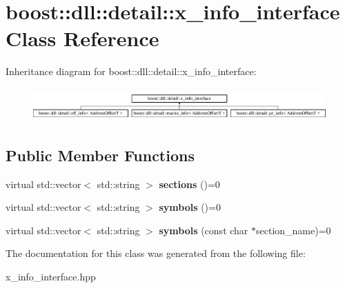 \hypertarget{a00337}{}\section{boost\+:\+:dll\+:\+:detail\+:\+:x\+\_\+info\+\_\+interface Class Reference}
\label{a00337}
Inheritance diagram for boost\+:\+:dll\+:\+:detail\+:\+:x\+\_\+info\+\_\+interface\+:\begin{figure}[H]
\begin{center}
\leavevmode
\includegraphics[height=1.296296cm]{a00337}
\end{center}
\end{figure}
\subsection*{Public Member Functions}
\begin{DoxyCompactItemize}
\item 
virtual std\+::vector$<$ std\+::string $>$ {\bfseries sections} ()=0\hypertarget{a00337_a34d086805a08f646f9e10ef010e0b205}{}\label{a00337_a34d086805a08f646f9e10ef010e0b205}

\item 
virtual std\+::vector$<$ std\+::string $>$ {\bfseries symbols} ()=0\hypertarget{a00337_ab6a8a24f236aafc5cdf8fa1b6ce61dab}{}\label{a00337_ab6a8a24f236aafc5cdf8fa1b6ce61dab}

\item 
virtual std\+::vector$<$ std\+::string $>$ {\bfseries symbols} (const char $\ast$section\+\_\+name)=0\hypertarget{a00337_acb39e3543f11831073b765b114864c97}{}\label{a00337_acb39e3543f11831073b765b114864c97}

\end{DoxyCompactItemize}


The documentation for this class was generated from the following file\+:\begin{DoxyCompactItemize}
\item 
x\+\_\+info\+\_\+interface.\+hpp\end{DoxyCompactItemize}
